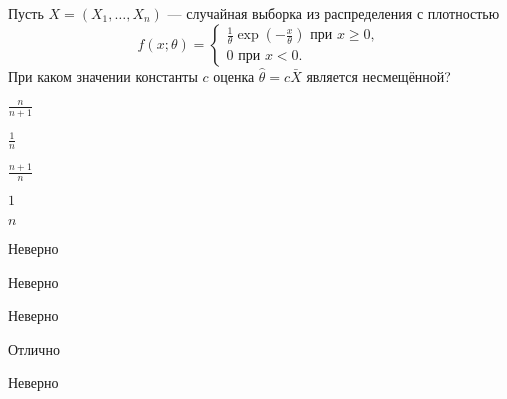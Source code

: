 
\begin{question}
Пусть \(X = (X_1, \ldots , X_n)\) — случайная выборка из распределения
с плотностью \[
f(x; \theta) =
\begin{cases}
\frac{1}{\theta}\exp(-\frac{x}{\theta}) \text{ при } x \geq 0,  \\
0 \text{ при } x < 0.
\end{cases}
\] При каком значении константы \(c\) оценка
\(\hat{\theta} = c \bar{X}\) является несмещённой?
\begin{answerlist}
  \item \(\frac{n}{n+1}\)
  \item \(\frac{1}{n}\)
  \item \(\frac{n + 1}{n}\)
  \item \(1\)
  \item \(n\)
\end{answerlist}
\end{question}

\begin{solution}
\begin{answerlist}
  \item Неверно
  \item Неверно
  \item Неверно
  \item Отлично
  \item Неверно
\end{answerlist}
\end{solution}

